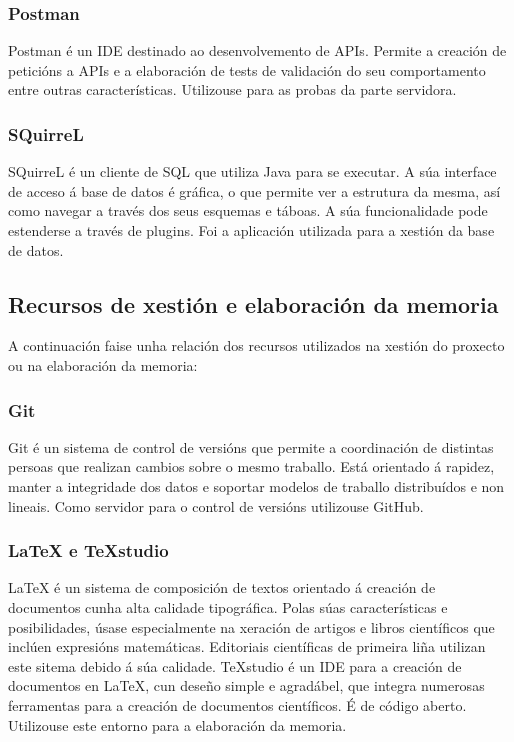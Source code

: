 \subsubsection{Postman}
Postman é un IDE destinado ao desenvolvemento de APIs. Permite a creación de peticións a APIs e a elaboración de tests de validación do seu comportamento entre outras características. Utilizouse para as probas da parte servidora.


\subsubsection{SQuirreL}
SQuirreL é un cliente de SQL que utiliza Java para se executar. A súa interface de acceso á base de datos é gráfica, o que permite ver a estrutura da mesma, así como navegar a través dos seus esquemas e táboas. A súa funcionalidade pode estenderse a través de plugins. Foi a aplicación utilizada para a xestión da base de datos.


\subsection{Recursos de xestión e elaboración da memoria}
A continuación faise unha relación dos recursos utilizados na xestión do proxecto ou na elaboración da memoria:

\subsubsection{Git}
Git é un sistema de control de versións que permite a coordinación de distintas persoas que realizan cambios sobre o mesmo traballo. Está orientado á rapidez, manter a integridade dos datos e soportar modelos de traballo distribuídos e non lineais. Como servidor para o control de versións utilizouse GitHub.


\subsubsection{LaTeX e TeXstudio}
LaTeX é un sistema de composición de textos orientado á creación de documentos cunha alta calidade tipográfica. Polas súas características e posibilidades, úsase especialmente na xeración de artigos e libros científicos que inclúen expresións matemáticas. Editoriais científicas de primeira liña utilizan este sitema debido á súa calidade.
TeXstudio é un IDE para a creación de documentos en LaTeX, cun deseño simple e agradábel, que integra numerosas ferramentas para a creación de documentos científicos. É de código aberto. Utilizouse este entorno para a elaboración da memoria.


